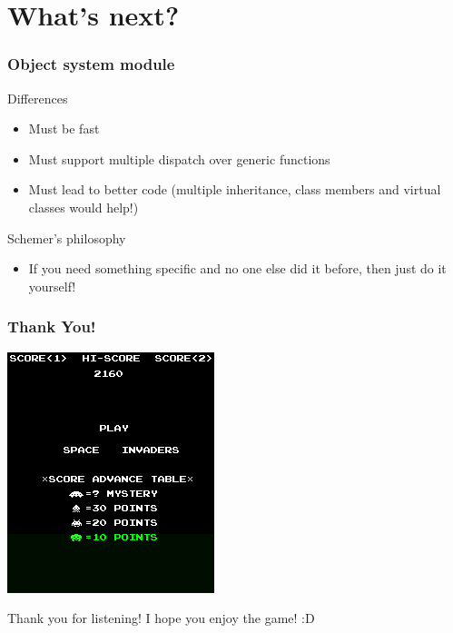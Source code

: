 \documentclass{beamer}
\newcommand{\<}[1]{\`#1}
\begin{document}

\section{What's next?}

\begin{frame}
  \frametitle{Object system module}

  \begin{block}{Differences}
    \begin{itemize}
    \item Must be \alert{fast}
    \item Must support multiple dispatch over generic functions
    \item Must lead to better code (multiple inheritance, class
      members and virtual classes would help!)
    \end{itemize}
  \end{block}

  \begin{block}{Schemer's philosophy}
    \begin{itemize}
    \item If you need something specific and no one else did it
      before, then just do it yourself!
    \end{itemize}
  \end{block}
\end{frame}

\begin{frame}
  \frametitle{Thank You!}
  \begin{center}
    \includegraphics[scale=0.4]{intro-movie2}
  \end{center}
  Thank you for listening! I hope you enjoy the game! :D
\end{frame}
\end{document}
